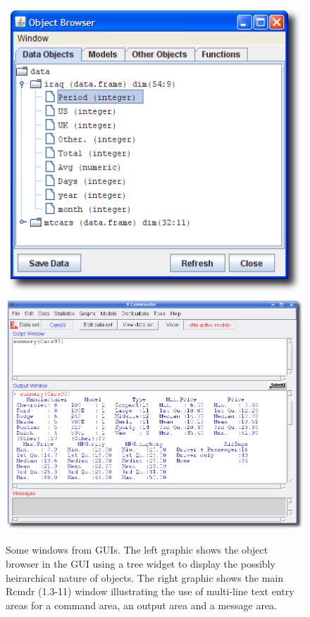 \begin{figure}
  \centering
  \includegraphics[width=.35\textwidth]{JGR-object-browser}
  \includegraphics[width=.5\textwidth]{Rcmdr-main-window}
  \caption{
    Some windows from \R\/ GUIs.
    The left graphic shows the object browser in the  GUI
    using a tree widget 
    to display the possibly heirarchical nature of \R\/ objects.
    The right graphic shows the main Rcmdr (1.3-11) window
    illustrating the use of multi-line text entry areas for a command
    area, an output area and a message area.}
  \label{fig:GUI:R-guis-exs-JGR-Rcmdr}
\end{figure}



